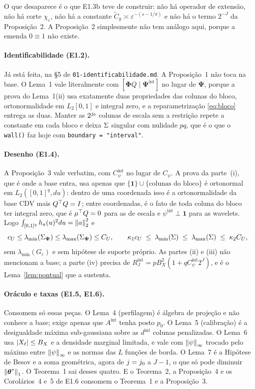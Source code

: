 \documentclass[11pt,a4paper]{article}
\newcommand{\bPsi}{\boldsymbol{\Psi}}
\newcommand{\bPhi}{\boldsymbol{\Phi}}
\newcommand{\lmin}{\lambda_{\min}}
\newcommand{\lmax}{\lambda_{\max}}
\newcommand{\Amat}{A}
\newcommand{\eps}{\varepsilon}
\newcommand{\Cpsiint}{C_{\psi}^{\mathrm{int}}}
\newcommand{\dint}{d^{\mathrm{int}}}
\newcommand{\pzero}{p_{0}}
\begin{document}
O que desaparece é o que E1.3b teve de construir: não há operador de
extensão, não há corte $\chi_{\eps}$, não há a constante
$\tilde C_{g} \asymp \eps^{-(s-1/\pi)}$ e não há o termo $2^{-J}$ da
Proposição~2. A Proposição~2 simplesmente não tem análogo aqui, porque a
emenda $0 \equiv 1$ não existe.

\paragraph{Identificabilidade (E1.2).} Já está feita, na §5 de
\texttt{01-identificabilidade.md}. A Proposição~1 não toca na base. O Lema~1
vale literalmente com $[\bPhi Q \mid \bPsi^{\mathrm{int}}]$ no lugar de
$\bPsi$, porque a prova do Lema~1(ii) usa exatamente duas propriedades das
colunas do bloco, ortonormalidade em $L_{2}[0,1]$ e integral zero, e a
reparametrização \eqref{eq:bloco} entrega as duas. Manter as $2^{j_{0}}$
colunas de escala sem a restrição repete a constante em cada bloco e deixa
$\Sigma$ singular com nulidade $pq$, que é o que o \texttt{wall()} faz hoje com
\texttt{boundary = "interval"}.

\paragraph{Desenho (E1.4).} A Proposição~3 vale verbatim, com $\Cpsiint$ no
lugar de $C_{\psi}$. A prova da parte~(i), que é onde a base entra, usa
apenas que $\{\mathbf{1}\}\cup\{\text{colunas do bloco}\}$ é ortonormal em
$L_{2}([0,1]^{q}, du)$: dentro de uma coordenada isso é a ortonormalidade da
base CDV mais $Q^{\top} Q = I$; entre coordenadas, é o fato de toda coluna do
bloco ter integral zero, que é $\mu^{\top} Q = 0$ para as de escala e
$\psi^{\mathrm{int}}\perp\mathbf{1}$ para as wavelets. Logo
$\int_{[0,1]^{q}}h_{a}(u)^{2}du = \left\lVert a \right\rVert_{2}^{2}$ e
\[
  c_{U}\le\lmin(\Gram_{\bPsi})\le\lmax(\Gram_{\bPsi})\le C_{U},
  \qquad
  \kappa_{1}c_{U} \;\le\; \lmin(\Gram) \;\le\; \lmax(\Gram) \;\le\;
  \kappa_{2}C_{U},
\]
sem $\lmin(G_{\eps})$ e sem hipótese de suporte próprio. As partes (ii) e
(iii) não mencionam a base; a parte (iv) precisa de
$R_{J}^{\mathrm{int}} = pB_{X}^{2}(1 + q\Cpsiint 2^{J})$, e é o
Lema~\ref{lem:pontual} que a sustenta.

\paragraph{Oráculo e taxas (E1.5, E1.6).} Consomem só essas peças. O Lema~4
(perfilagem) é álgebra de projeção e não conhece a base; exige apenas que
$\Amat^{\mathrm{int}}$ tenha posto $\pzero$. O Lema~5 (calibração) é a
desigualdade máxima sub-gaussiana sobre as $\dint$ colunas penalizadas. O
Lema~6 usa $|X_{\ell}|\le B_{X}$ e a densidade marginal limitada, e vale com
$\left\lVert \psi \right\rVert_{\infty}$ trocado pelo máximo entre $\left\lVert \psi \right\rVert_{\infty}$ e as
normas das $L$ funções de borda. O Lema~7 é a Hipótese de Besov e a soma
geométrica, agora de $j = j_{0}$ a $J-1$, o que só pode diminuir
$\left\lVert \boldsymbol{\theta}^{*} \right\rVert_{1}$. O Teorema~1 sai desses quatro. E o Teorema~2, a
Proposição~4 e os Corolários~4 e~5 de E1.6 consomem o Teorema~1 e a
Proposição~3.
\end{document}
